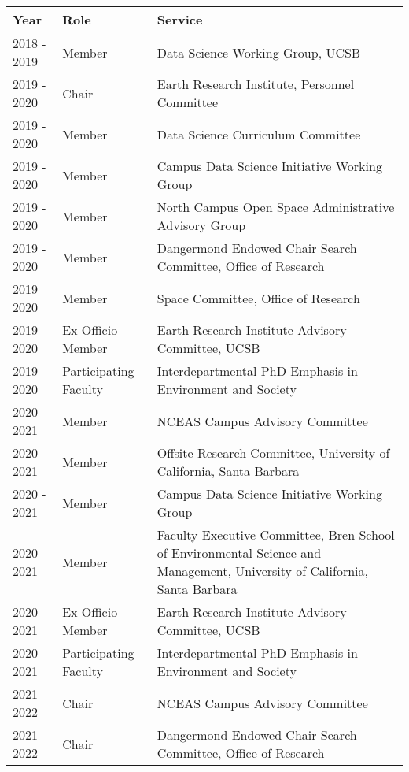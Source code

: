 
\begin{longtable}{llp{12cm}}
Year & Role & Service\\
\hline 
\endhead 
2018 - 2019 & Member & Data Science Working Group, UCSB \\
2019 - 2020 & Chair & Earth Research Institute, Personnel Committee \\
2019 - 2020 & Member & Data Science Curriculum Committee \\
2019 - 2020 & Member & Campus Data Science Initiative Working Group \\
2019 - 2020 & Member & North Campus Open Space Administrative Advisory Group \\
2019 - 2020 & Member & Dangermond Endowed Chair Search Committee, Office of Research \\
2019 - 2020 & Member & Space Committee, Office of Research \\
2019 - 2020 & Ex-Officio Member & Earth Research Institute Advisory Committee, UCSB \\
2019 - 2020 & Participating Faculty & Interdepartmental PhD Emphasis in Environment and Society \\
2020 - 2021 & Member  & NCEAS Campus Advisory Committee  \\
2020 - 2021 & Member & Offsite Research Committee, University of California, Santa Barbara \\
2020 - 2021 & Member & Campus Data Science Initiative Working Group \\
2020 - 2021 & Member & Faculty Executive Committee, Bren School of Environmental Science and Management, University of California, Santa Barbara \\
2020 - 2021 & Ex-Officio Member & Earth Research Institute Advisory Committee, UCSB \\
2020 - 2021 & Participating Faculty & Interdepartmental PhD Emphasis in Environment and Society \\
2021 - 2022 & Chair & NCEAS Campus Advisory Committee  \\
2021 - 2022 & Chair & Dangermond Endowed Chair Search Committee, Office of Research \\
\end{longtable}

